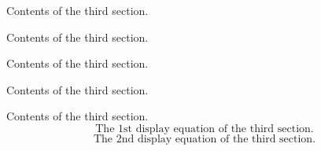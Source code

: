 \documentclass[10pt]{book}
\theoremstyle{definition}
\begin{document}
\newpage
\lhead[\footnotesize\thepage\fancyplain{}\leftmark]{}\rhead[]{\fancyplain{}\rightmark\footnotesize\thepage}%


\setcounter{chapter}{3}
\setcounter{equation}{0} %

Contents of the third section.

Contents of the third section.

Contents of the third section.

Contents of the third section.

Contents of the third section.
\begin{equation}\label{3.1}
\mbox {The 1st display equation of the third section.}
\end{equation}
\begin{equation}\label{3.2}
\mbox {The 2nd display equation of the third section.}
\end{equation}
\newpage
\end{document}
